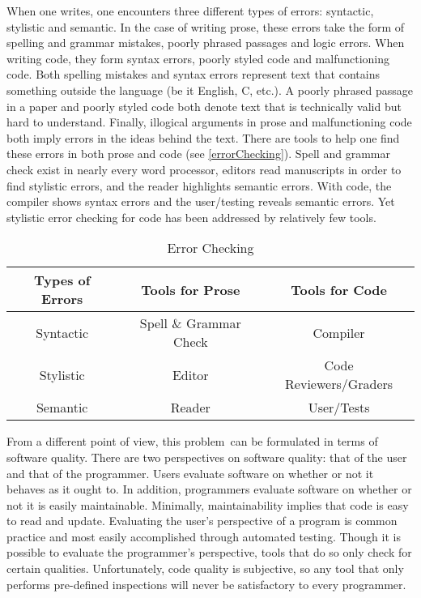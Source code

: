 \documentclass[12pt]{report}
\begin{document}
When one writes, one encounters three different types of errors: syntactic, stylistic and semantic.  
In the case of writing prose, these errors take the form of spelling and grammar mistakes, poorly phrased 
passages and logic errors. When writing code, they form syntax errors, poorly styled code and 
malfunctioning code. Both spelling mistakes and syntax errors represent text that contains something 
outside the language (be it English, C, etc.). A poorly phrased passage in a paper and poorly styled code 
both denote text that is technically valid but hard to understand. Finally, illogical arguments in prose and 
malfunctioning code both imply errors in the ideas behind the text. There are tools to help one find these 
errors in both prose and code (see \autoref{errorChecking}). Spell and grammar check exist in nearly 
every word processor, editors read manuscripts in order to find stylistic errors, and the reader highlights 
semantic errors. With code, the compiler shows syntax errors and the user\slash testing reveals semantic 
errors. Yet stylistic error checking for code has been addressed by relatively few tools.

\begin{table}%
	\begin{center}
	\begin{tabular}{ccc}
		\toprule
		Types of Errors & Tools for Prose & Tools for Code \\
		\midrule
		Syntactic & Spell \& Grammar Check & Compiler \\
		Stylistic & Editor & Code Reviewers\slash Graders \\ 
		Semantic & Reader & User\slash Tests \\
		\bottomrule
	\end{tabular}
	\end{center}
	\caption{Error Checking}
	\label{errorChecking}
\end{table}


From a different point of view, this problem\ can be formulated in terms of software quality. 
There are two perspectives on software quality: that of the user and that of the programmer. 
Users evaluate software on whether or not it behaves as it ought to. In addition, programmers evaluate 
software on whether or not it is easily maintainable. Minimally, maintainability implies that 
code is easy to read and update. Evaluating the user's perspective of a program is common practice and 
most easily accomplished through automated testing. Though it is possible to evaluate the programmer's 
perspective, tools that do so only check for certain qualities. Unfortunately, code quality is 
subjective, so any tool that only performs pre-defined inspections will never be satisfactory to every 
programmer.
\end{document}

